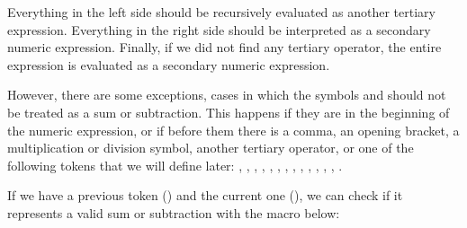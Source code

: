 Everything in the left side should be recursively evaluated as another
tertiary expression. Everything in the right side should be
interpreted as a secondary numeric expression. Finally, if we did not
find any tertiary operator, the entire expression is evaluated as a
secondary numeric expression.

However, there are some exceptions, cases in which the
symbols \monoespaco{+} and \monoespaco{-} should not be treated as a
sum or subtraction. This happens if they are in the beginning of the
numeric expression, or if before them there is a comma, an opening
bracket, a multiplication or division symbol, another tertiary
operator, or one of the following tokens that we will define later:
, , ,
, , ,
,  , ,
, , ,
, .

If we have a previous token () and the current one
(), we can check if it represents a valid sum or
subtraction with the macro below:

